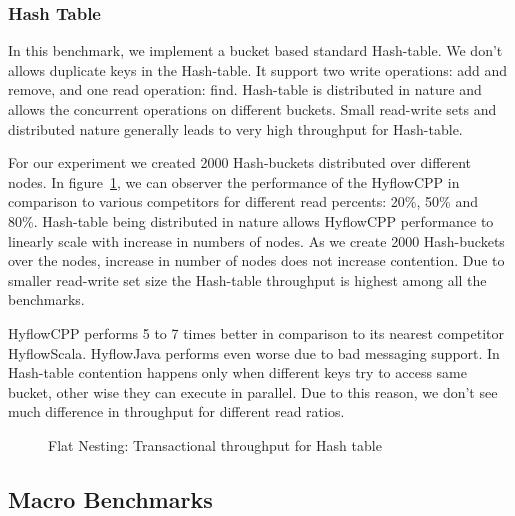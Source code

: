 \documentclass[12pt,english]{report}
\begin{document}
\subsubsection{Hash Table}
In this benchmark, we implement a bucket based standard Hash-table. We don't allows duplicate keys in the Hash-table. It support two write operations: add and remove, and one read operation: find. Hash-table is distributed in nature and allows the concurrent operations on different buckets. Small read-write sets and distributed nature generally leads to very high throughput for Hash-table.

For our experiment we created 2000 Hash-buckets distributed over different nodes. In figure~\ref{Fig:flatHashTable}, we can observer the performance of the HyflowCPP in comparison to various competitors for different read percents: 20\%, 50\% and 80\%. Hash-table being distributed in nature allows HyflowCPP performance to linearly scale with increase in numbers of nodes. As we create 2000 Hash-buckets over the nodes, increase in number of nodes does not increase contention. Due to smaller read-write set size the Hash-table throughput is highest among all the benchmarks.

HyflowCPP performs 5 to 7 times better in comparison to its nearest competitor HyflowScala. HyflowJava performs even worse due to bad messaging support. In Hash-table contention happens only when different keys try to access same bucket, other wise they can execute in parallel. Due to this reason, we don't see much difference in throughput for different read ratios.

\begin{figure}[H]
\centering
{}
\end{figure}
\begin{figure}[H]
\centering
{}
\end{figure}
\begin{figure}[H]
\centering
{}
\caption{Flat Nesting: Transactional throughput for Hash table}
\label{Fig:flatHashTable}
\end{figure}

\subsection{Macro Benchmarks}
\end{document}
